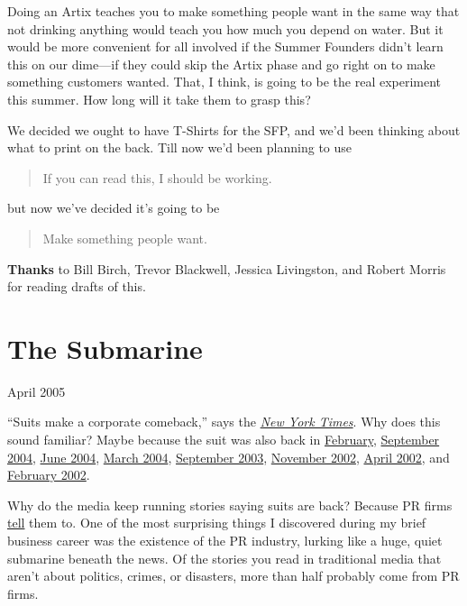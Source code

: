 \documentclass[12pt]{book}
\begin{document}
Doing an Artix teaches you to make something people want in the same way
that not drinking anything would teach you how much you depend on water.
But it would be more convenient for all involved if the Summer Founders
didn't learn this on our dime---if they could skip the Artix phase and
go right on to make something customers wanted. That, I think, is going
to be the real experiment this summer. How long will it take them to
grasp this?

We decided we ought to have T-Shirts for the SFP, and we'd been thinking
about what to print on the back. Till now we'd been planning to use

\begin{quote}
If you can read this, I should be working.
\end{quote}

but now we've decided it's going to be

\begin{quote}
Make something people want.
\end{quote}


\textbf{Thanks} to Bill Birch, Trevor Blackwell, Jessica Livingston, and
Robert Morris for reading drafts of this.
\chapter{The Submarine}

April 2005

``Suits make a corporate comeback,'' says the
\href{http://www.nytimes.com/2005/04/14/fashion/thursdaystyles/14peacock.html?ex=1271131200&en=e96f2670387e3636&ei=5090&partner=rssuserland}{\emph{New
York Times}}. Why does this sound familiar? Maybe because the suit was
also back in
\href{http://www.cvbizlink.com/articles/2005/04/07/news/news/doc42406f05edf53293947237.prt}{February},
\href{http://www.usatoday.com/money/industries/retail/2004-09-01-suits_x.htm}{September
2004},
\href{http://www.cnn.com/2004/BUSINESS/06/23/go.fashion.jones/}{June
2004}, \href{http://www.post-gazette.com/pg/04062/279616.stm}{March
2004},
\href{http://www.southcoasttoday.com/daily/09-03/09-21-03/c01li238.htm}{September
2003},
\href{http://www.businessweek.com/magazine/content/02_46/b3808122.htm}{November
2002}, \href{http://www.pittsburghlive.com/x/s_65540.html}{April 2002},
and \href{http://news.bbc.co.uk/1/hi/business/1836010.stm}{February
2002}.

Why do the media keep running stories saying suits are back? Because PR
firms \href{http://www.maximumexposurepr.com/middleMAA.html}{tell} them
to. One of the most surprising things I discovered during my brief
business career was the existence of the PR industry, lurking like a
huge, quiet submarine beneath the news. Of the stories you read in
traditional media that aren't about politics, crimes, or disasters, more
than half probably come from PR firms.
\end{document}
